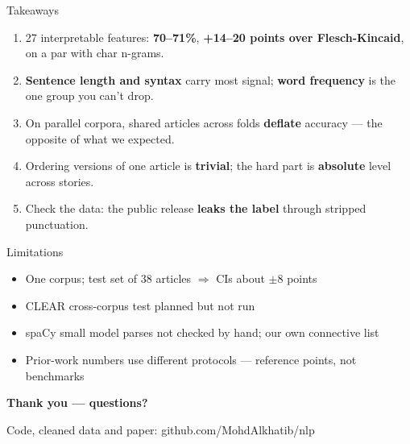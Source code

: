 \documentclass[aspectratio=169,11pt]{beamer}
\newcommand{\subtle}[1]{{\color{muted}\small #1}}
\begin{document}
\begin{frame}{Takeaways}
\begin{enumerate}
\setlength\itemsep{0.7em}
\item 27 interpretable features: \textbf{70--71\%}, \textbf{+14--20 points over Flesch-Kincaid}, on a par with char n-grams.
\item \textbf{Sentence length and syntax} carry most signal; \textbf{word frequency} is the one group you can't drop.
\item On parallel corpora, shared articles across folds \textbf{deflate} accuracy --- the opposite of what we expected.
\item Ordering versions of one article is \textbf{trivial}; the hard part is \textbf{absolute} level across stories.
\item Check the data: the public release \textbf{leaks the label} through stripped punctuation.
\end{enumerate}
\end{frame}

\begin{frame}{Limitations}
\begin{itemize}
\setlength\itemsep{0.6em}
\item One corpus; test set of 38 articles $\Rightarrow$ CIs about $\pm$8 points
\item CLEAR cross-corpus test planned but not run
\item spaCy small model parses not checked by hand; our own connective list
\item Prior-work numbers use different protocols --- reference points, not benchmarks
\end{itemize}
\vfill
\centering
{\Large\bfseries Thank you --- questions?}\par\vspace{0.4em}
\subtle{Code, cleaned data and paper: github.com/MohdAlkhatib/nlp}
\end{frame}
\end{document}
